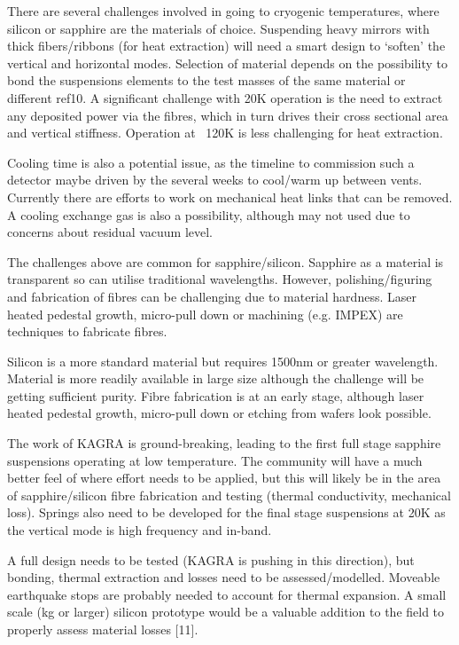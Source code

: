 There are several challenges involved in going to cryogenic temperatures, where silicon or sapphire are the materials of choice.
Suspending heavy mirrors with thick fibers/ribbons (for heat extraction) will need a smart design to ‘soften’ the vertical and horizontal modes. Selection of material depends on the possibility to bond the suspensions elements to the test masses of the same material or different ref10. A significant challenge with 20K operation is the need to extract any deposited power via the fibres, which in turn drives their cross sectional area and vertical stiffness. Operation at ~120K is less challenging for heat extraction.

Cooling time is also a potential issue, as the timeline to commission such a detector maybe driven by the several weeks to cool/warm up between vents. Currently there are efforts to work on mechanical heat links that can be removed. A cooling exchange gas is also a possibility, although may not used due to concerns about residual vacuum level.

The challenges above are common for sapphire/silicon. Sapphire as a material is transparent so can utilise traditional wavelengths. However, polishing/figuring and fabrication of fibres can be challenging due to material hardness. Laser heated pedestal growth, micro-pull down or machining (e.g. IMPEX) are techniques to fabricate fibres.

Silicon is a more standard material but requires 1500nm or greater wavelength. Material is more readily available in large size although the challenge will be getting sufficient purity. Fibre fabrication is at an early stage, although laser heated pedestal growth, micro-pull down or etching from wafers look possible.

The work of KAGRA is ground-breaking, leading to the first full stage sapphire suspensions operating at low temperature. The community will have a much better feel of where effort needs to be applied, but this will likely be in the area of sapphire/silicon fibre fabrication and testing (thermal conductivity, mechanical loss). Springs also need to be developed for the final stage suspensions at 20K as the vertical mode is high frequency and in-band.

A full design needs to be tested (KAGRA is pushing in this direction), but bonding, thermal extraction and losses need to be assessed/modelled. Moveable earthquake stops are probably needed to account for thermal expansion. A small scale (kg or larger) silicon prototype would be a valuable addition to the field to properly assess material losses [11].

